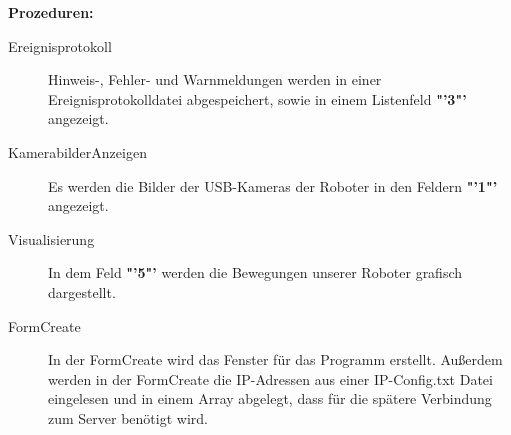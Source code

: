 \textbf{Prozeduren:}
\begin{description}
	\item[Ereignisprotokoll] Hinweis-, Fehler- und Warnmeldungen werden in einer Ereignisprotokolldatei abgespeichert, sowie in einem Listenfeld \textbf{"'3"'} angezeigt.
	\item[KamerabilderAnzeigen] Es werden die Bilder der USB-Kameras der Roboter in den Feldern \textbf{"'1"'} angezeigt.
	\item[Visualisierung] In dem Feld \textbf{"'5"'} werden die Bewegungen unserer Roboter grafisch dargestellt.
	\item[FormCreate] In der FormCreate wird das Fenster für das Programm erstellt. Außerdem werden in der FormCreate die IP-Adressen aus einer IP-Config.txt Datei eingelesen und in einem Array abgelegt, dass für die spätere Verbindung zum Server benötigt wird.
\end{description}
